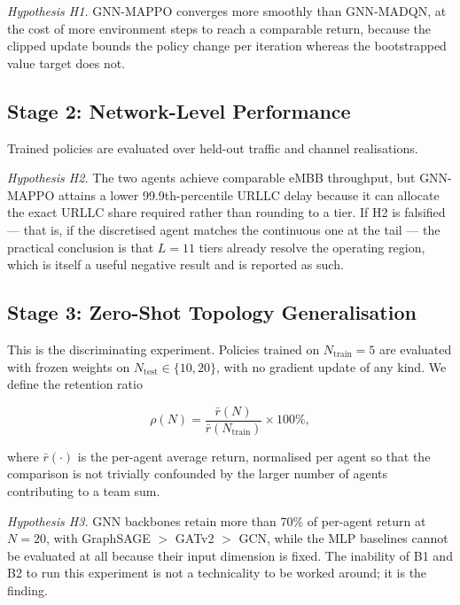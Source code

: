 \documentclass[journal]{IEEEtran}
\begin{document}
\emph{Hypothesis H1.} GNN-MAPPO converges more smoothly than
GNN-MADQN, at the cost of more environment steps to reach a comparable
return, because the clipped update bounds the policy change per
iteration whereas the bootstrapped value target does not.
 
\subsection{Stage 2: Network-Level Performance}
Trained policies are evaluated over held-out traffic and channel
realisations.
 
\emph{Hypothesis H2.} The two agents achieve comparable eMBB
throughput, but GNN-MAPPO attains a lower 99.9th-percentile URLLC delay
because it can allocate the exact URLLC share required rather than
rounding to a tier. If H2 is falsified --- that is, if the discretised
agent matches the continuous one at the tail --- the practical
conclusion is that $L=11$ tiers already resolve the operating region,
which is itself a useful negative result and is reported as such.
 
\subsection{Stage 3: Zero-Shot Topology Generalisation}
This is the discriminating experiment. Policies trained on
$N_{\mathrm{train}} = 5$ are evaluated with frozen weights on
$N_{\mathrm{test}} \in \{10, 20\}$, with no gradient update of any
kind. We define the retention ratio

\begin{equation}
\rho(N) = \frac{\bar{r}(N)}{\bar{r}(N_{\mathrm{train}})} \times 100\%,
\label{eq:retention}
\end{equation}

where $\bar{r}(\cdot)$ is the per-agent average return, normalised
per agent so that the comparison is not trivially confounded by the
larger number of agents contributing to a team sum.

\emph{Hypothesis H3.} GNN backbones retain more than 70\% of
per-agent return at $N=20$, with GraphSAGE $>$ GATv2 $>$ GCN, while the
MLP baselines cannot be evaluated at all because their input dimension
is fixed. The inability of B1 and B2 to run this experiment is not a
technicality to be worked around; it is the finding.
\end{document}
